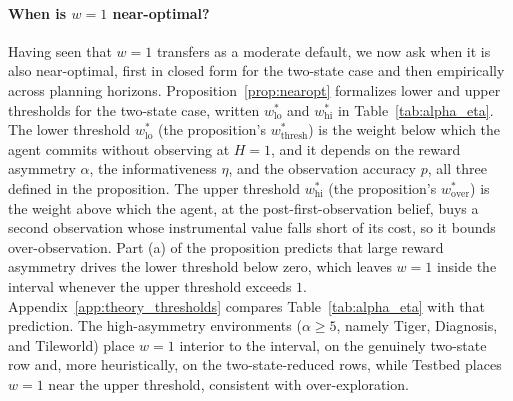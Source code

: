 \paragraph{When is $w{=}1$ near-optimal?}
Having seen that $w{=}1$ transfers as a moderate default, we now ask when it is also near-optimal, first in closed form for the two-state case and then empirically across planning horizons. Proposition~\ref{prop:nearopt} formalizes lower and upper thresholds for the two-state case, written $w^*_{\mathrm{lo}}$ and $w^*_{\mathrm{hi}}$ in Table~\ref{tab:alpha_eta}. The lower threshold $w^*_{\mathrm{lo}}$ (the proposition's $w^*_{\mathrm{thresh}}$) is the weight below which the agent commits without observing at $H{=}1$, and it depends on the reward asymmetry $\alpha$, the informativeness $\eta$, and the observation accuracy $p$, all three defined in the proposition. The upper threshold $w^*_{\mathrm{hi}}$ (the proposition's $w^*_{\mathrm{over}}$) is the weight above which the agent, at the post-first-observation belief, buys a second observation whose instrumental value falls short of its cost, so it bounds over-observation. Part (a) of the proposition predicts that large reward asymmetry drives the lower threshold below zero, which leaves $w{=}1$ inside the interval whenever the upper threshold exceeds $1$. Appendix~\ref{app:theory_thresholds} compares Table~\ref{tab:alpha_eta} with that prediction. The high-asymmetry environments ($\alpha \geq 5$, namely Tiger, Diagnosis, and Tileworld) place $w{=}1$ interior to the interval, on the genuinely two-state row and, more heuristically, on the two-state-reduced rows, while Testbed places $w{=}1$ near the upper threshold, consistent with over-exploration.

